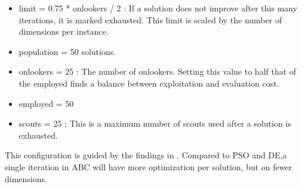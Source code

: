 \begin{itemize}
\item limit = 0.75 * onlookers / 2 : If a solution does not improve after this many iterations, it is marked exhausted. This limit is scaled by the number of dimensions per instance. 
\item population = 50 solutions.
\item onlookers = 25 : The number of onlookers. Setting this value to half that of the employed finds a balance between exploitation and evaluation cost.
\item employed = 50 
\item scouts = 25 : This is a maximum number of scouts used after a solution is exhausted. 
\end{itemize}
This configuration is guided by the findings in \cite{ABC}. Compared to PSO and DE,a single iteration in ABC will have more optimization per solution, but on fewer dimensions.
